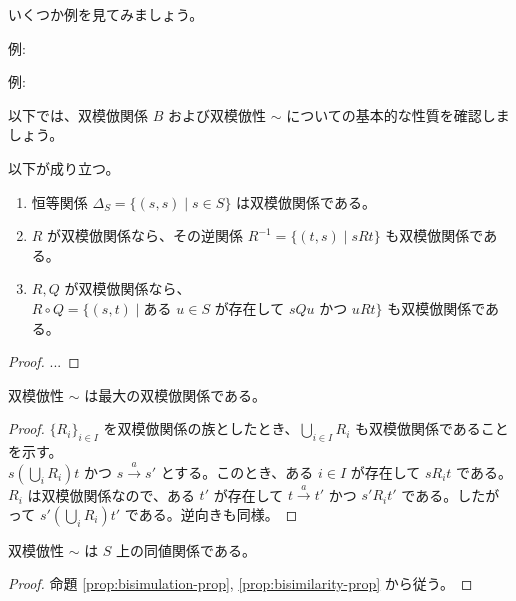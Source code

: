 \documentclass[
		head_space=20mm,
		foot_space=20mm,
		gutter=10mm,
		line_length=190mm
]{jlreq}
\begin{document}
\noindent いくつか例を見てみましょう。

\begin{oframed}
	\noindent 例: 
\end{oframed}

\begin{oframed}
	\noindent 例: 
\end{oframed}

\clearpage

\noindent 以下では、双模倣関係 $B$ および双模倣性 $\sim$ についての基本的な性質を確認しましょう。

\begin{proposition} \label{prop:bisimulation-prop}
	以下が成り立つ。
	\begin{enumerate}
		\item 恒等関係 $\Delta_S=\{(s,s)\mid s\in S\}$ は双模倣関係である。
		\item $R$ が双模倣関係なら、その逆関係 $R^{-1}=\{(t,s)\mid sRt\}$ も双模倣関係である。
		\item $R,Q$ が双模倣関係なら、$R\circ Q=\{(s,t)\mid \textrm{ある $u\in S$ が存在して $sQu$ かつ $uRt$}\}$ も双模倣関係である。
	\end{enumerate}
\end{proposition}

\begin{proof}
	... 
\end{proof}


\begin{proposition} \label{prop:bisimilarity-prop}
	双模倣性 $\sim$ は最大の双模倣関係である。
\end{proposition}

\begin{proof}
	$\{R_i\}_{i\in I}$ を双模倣関係の族としたとき、$\bigcup_{i\in I} R_i$ も双模倣関係であることを示す。\\
	$s\mathbin{(\bigcup_i R_i)}t$ かつ $s\xrightarrow{a}s'$ とする。このとき、ある $i\in I$ が存在して $sR_i t$ である。$R_i$ は双模倣関係なので、ある $t'$ が存在して $t\xrightarrow{a}t'$ かつ $s'R_it'$ である。したがって $s'\mathbin{(\bigcup_i R_i)}t'$ である。逆向きも同様。
\end{proof}


\begin{proposition}
	双模倣性 $\sim$ は $S$ 上の同値関係である。
\end{proposition}

\begin{proof}
	命題 \ref{prop:bisimulation-prop}, \ref{prop:bisimilarity-prop} から従う。
\end{proof}
\end{document}
